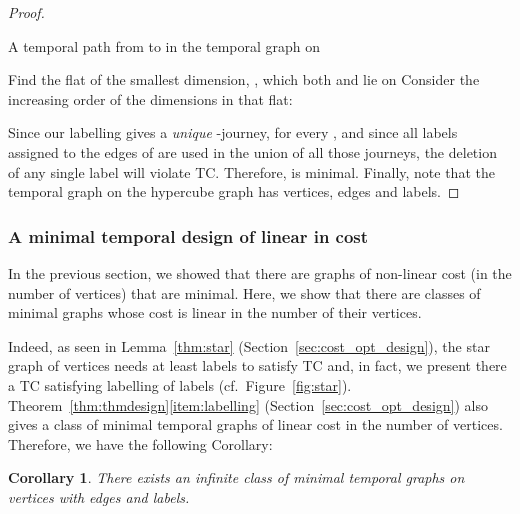 \documentclass[a4paper,UKenglish]{article}
\newtheorem{corollary}{Corollary}
\begin{document}
\begin{proof}
\begin{algorithm}[ht]
\caption{A temporal path from  to  in the temporal graph on }
\label{journeyQn}
\SetAlgoLined

	\;
	Find the flat of the smallest dimension, , which both  and  lie on\;
	Consider the increasing order of the  dimensions in that flat: \;
\end{algorithm}


Since our labelling gives a \emph{unique} -journey, for every , and since all labels assigned to the edges of  are used in the union of all those journeys, the deletion of any single label will violate TC. Therefore,  is minimal. Finally, note that the temporal graph  on the hypercube graph  has  vertices,  edges and  labels.
\end{proof}

















\subsubsection{A minimal temporal design of linear in \texorpdfstring{}{n} cost}
In the previous section, we showed that there are graphs of non-linear cost (in the number of vertices) that are minimal. Here, we show that there are classes of minimal graphs whose cost is linear in the number of their vertices.


Indeed, as seen in Lemma~\ref{thm:star} (Section~\ref{sec:cost_opt_design}), the star graph of  vertices needs at least  labels to satisfy TC and, in fact, we present there a TC satisfying labelling of  labels (cf.~Figure~\ref{fig:star}). Theorem~\ref{thm:thmdesign}\ref{item:labelling} (Section~\ref{sec:cost_opt_design}) also gives a class of minimal temporal graphs of linear cost in the number of vertices. Therefore, we have the following Corollary:

\begin{corollary}
There exists an infinite class of minimal temporal graphs on  vertices with  edges and  labels.
\end{corollary}
\end{document}

